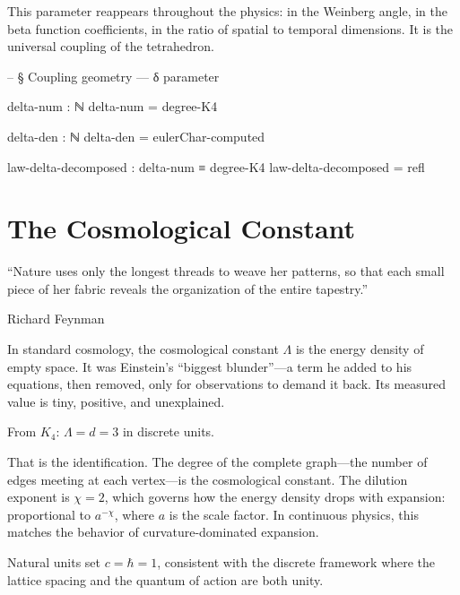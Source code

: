 \documentclass[11pt,a4paper]{book}
\begin{document}
This parameter reappears throughout the physics: in the Weinberg angle, in the beta function coefficients, in the ratio of spatial to temporal dimensions. It is the universal coupling of the tetrahedron.

\begin{code}
-- § Coupling geometry — δ parameter

delta-num : ℕ
delta-num = degree-K4

delta-den : ℕ
delta-den = eulerChar-computed

law-delta-decomposed : delta-num ≡ degree-K4
law-delta-decomposed = refl
\end{code}

\chapter{The Cosmological Constant}
\label{ch:cosmological-constant}

\epigraph{``Nature uses only the longest threads to weave her patterns, so that each small piece of her fabric reveals the organization of the entire tapestry.''}{Richard Feynman}

In standard cosmology, the cosmological constant $\Lambda$ is the energy density of empty space. It was Einstein's ``biggest blunder''---a term he added to his equations, then removed, only for observations to demand it back. Its measured value is tiny, positive, and unexplained.

From $K_4$: $\Lambda = d = 3$ in discrete units.

That is the identification. The degree of the complete graph---the number of edges meeting at each vertex---is the cosmological constant. The dilution exponent is $\chi = 2$, which governs how the energy density drops with expansion: proportional to $a^{-\chi}$, where $a$ is the scale factor. In continuous physics, this matches the behavior of curvature-dominated expansion.

Natural units set $c = \hbar = 1$, consistent with the discrete framework where the lattice spacing and the quantum of action are both unity.
\end{document}
